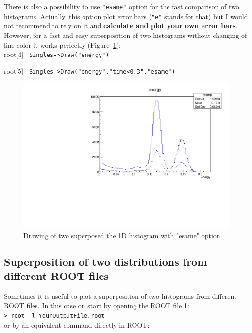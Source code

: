 \documentclass[12pt]{article}
\begin{document}
There is also a possibility to use \verb|"esame"| option for the fast comparison of two histograms. Actually, this option plot error bars (\verb|"e"| stands for that) but I would not recommend to rely on it and \textbf{calculate and plot your own error bars}. However, for a fast and easy superposition of two histograms without changing of line color it works perfectly (Figure~\ref{fig:1Dhist_esame}):\\

root[4] \verb| Singles->Draw("energy") |

root[5] \verb| Singles->Draw("energy","time<0.3","esame") |\\

\begin{figure}[h]
\centering
\includegraphics[scale=0.5]{figs/1Dhist_esame.pdf}
\caption{Drawing of two superposed the 1D histogram with "esame" option}
\label{fig:1Dhist_esame}
\end{figure}

\clearpage
\subsection{Superposition of two distributions from different ROOT files}
Sometimes it is useful to plot a superposition of two histograms from different ROOT files. In this case on start by opening the ROOT file 1:\\ 

\verb|> root -l YourOutputFile.root |\\

or by an equivalent command directly in ROOT:\\
\end{document}
